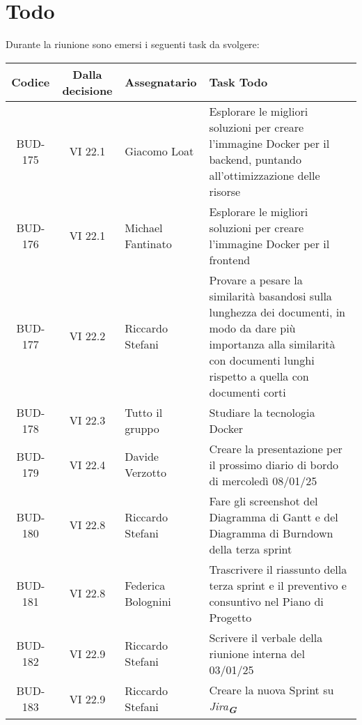 
\section{Todo}

Durante la riunione sono emersi i seguenti task da svolgere:

\vspace{0.5cm}

\begin{table}[htbp]
\centering
{}
\begin{tabular}{|c|c|p{}|p{}|}
    \hline
    \rowcolor[gray]{0.75}
    \textbf{Codice} & \textbf{Dalla decisione} & \textbf{Assegnatario} & \textbf{Task Todo} \\
    \hline
    BUD-175 & VI 22.1 & Giacomo Loat & Esplorare le migliori soluzioni per creare l'immagine Docker per il backend, puntando
    all'ottimizzazione delle risorse\\
    \hline
    BUD-176 & VI 22.1 & Michael Fantinato & Esplorare le migliori soluzioni per creare l'immagine Docker per il frontend\\
    \hline
    BUD-177 & VI 22.2 & Riccardo Stefani & Provare a pesare la similarità basandosi sulla lunghezza dei documenti, in modo da dare 
    più importanza alla similarità con documenti lunghi rispetto a quella con documenti corti\\
    \hline
    BUD-178 & VI 22.3 & Tutto il gruppo & Studiare la tecnologia Docker\\
    \hline
    BUD-179 & VI 22.4 & Davide Verzotto & Creare la presentazione per il prossimo diario di bordo di mercoledì 08/01/25\\
    \hline
    BUD-180 & VI 22.8 & Riccardo Stefani & Fare gli screenshot del Diagramma di Gantt e del Diagramma di Burndown della terza sprint\\
    \hline
    BUD-181 & VI 22.8 & Federica Bolognini & Trascrivere il riassunto della terza sprint e il preventivo e consuntivo nel Piano di Progetto\\
    \hline
    BUD-182 & VI 22.9 & Riccardo Stefani & Scrivere il verbale della riunione interna del 03/01/25\\
    \hline
    BUD-183 & VI 22.9 & Riccardo Stefani & Creare la nuova Sprint su \emph{Jira}\textsubscript{\textit{\textbf{G}}}\\
    \hline
\end{tabular}
\end{table}